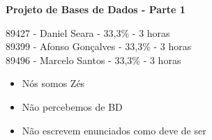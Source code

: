 \documentclass[12pt]{report}
\begin{document}
    \begin{titlepage}
        \begin{center}

            \vspace*{\fill}
            \Huge
            \textbf{Projeto de Bases de Dados - Parte 1}
            
            \vspace*{\fill}

            \Large
            89427 - Daniel Seara - 33,3\% - 3 horas \\
            89399 - Afonso Gonçalves - 33,3\% - 3 horas \\
            89496 - Marcelo Santos - 33,3\% - 3 horas \\


        
        \end{center}
\end{titlepage}

\clearpage\mbox{}\clearpage

    \LARGE

    \normalsize
    \begin{itemize}
        \item Nós somos Zés
        \item Não percebemos de BD
        \item Não escrevem enunciados como deve de ser
        
    \end{itemize}
\end{document}
